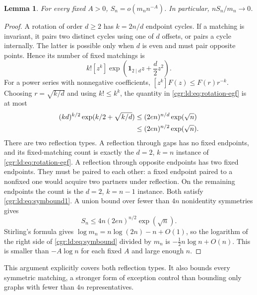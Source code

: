 \documentclass[11pt,letterpaper]{article}
\numberwithin{equation}{section}
\newtheorem{lemma}[theorem]{Lemma}
\theoremstyle{definition}\newtheorem{definition}[theorem]{Definition}
\theoremstyle{remark}\newtheorem{remark}[theorem]{Remark}
\newcommand{\one}{\mathbf1}
\begin{document}
\begin{lemma}\label{cgr:ld:lem:symmetry}
For every fixed $A>0$, $S_n=o(m_n n^{-A})$.
In particular, $nS_n/m_n\to0$.
\end{lemma}
\begin{proof}
A rotation of order $d\ge2$ has $k=2n/d$ endpoint cycles. If a
matching is invariant, it pairs two distinct cycles using one of
$d$ offsets, or pairs a cycle internally. The latter is possible
only when $d$ is even and must pair opposite points. Hence its
number of fixed matchings is
\begin{equation}\label{cgr:ld:eq:rotation-egf}
 k![z^k]\exp\left(\one_{2\mid d}z+\frac d2z^2\right).
\end{equation}
For a power series with nonnegative coefficients,
$[z^k]F(z)\le F(r)r^{-k}$. Choosing $r=\sqrt{k/d}$ and using
$k!\le k^k$, the quantity in \eqref{cgr:ld:eq:rotation-egf} is at most
\begin{align}
 (kd)^{k/2}\exp(k/2+\sqrt{k/d})
 &\le (2en)^{n/d}\exp(\sqrt n)\notag\\
 &\le (2en)^{n/2}\exp(\sqrt n).\label{cgr:ld:eq:symbound1}
\end{align}
There are two reflection types. A reflection through gaps has no
fixed endpoints, and its fixed-matching count is exactly the
$d=2$, $k=n$ instance of \eqref{cgr:ld:eq:rotation-egf}. A reflection
through opposite endpoints has two fixed endpoints. They must be
paired to each other: a fixed endpoint paired to a nonfixed one
would acquire two partners under reflection. On the remaining
endpoints the count is the $d=2$, $k=n-1$ instance. Both satisfy
\eqref{cgr:ld:eq:symbound1}. A union bound over fewer than $4n$
nonidentity symmetries gives
\begin{equation}\label{cgr:ld:eq:symbound}
 S_n\le 4n(2en)^{n/2}\exp(\sqrt n).
\end{equation}
Stirling's formula gives $\log m_n=n\log(2n)-n+O(1)$, so the
logarithm of the right side of \eqref{cgr:ld:eq:symbound} divided by
$m_n$ is $-\tfrac12 n\log n+O(n)$. This is smaller than
$-A\log n$ for each fixed $A$ and large enough $n$.
\end{proof}

This argument explicitly covers both reflection types. It also
bounds every symmetric matching, a stronger form of exception
control than bounding only graphs with fewer than $4n$
representatives.
\end{document}
